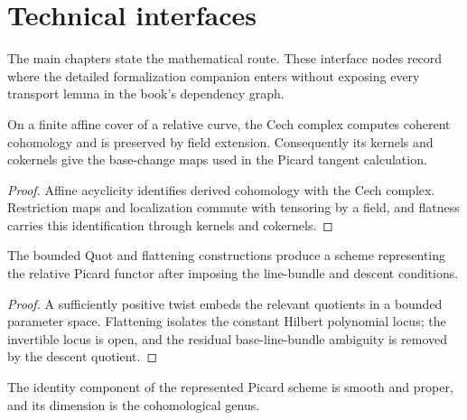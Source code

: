 \chapter{Technical interfaces}
\label{mk-app-technical}

The main chapters state the mathematical route.  These interface nodes record
where the detailed formalization companion enters without exposing every
transport lemma in the book's dependency graph.

\begin{proposition}
  \label{mk-app-cech-interface}
  \cite{stacks-cohomology-schemes,stacks-project}
  On a finite affine cover of a relative curve, the Cech complex computes
  coherent cohomology and is preserved by field extension.  Consequently its
  kernels and cokernels give the base-change maps used in the Picard tangent
  calculation.
\end{proposition}

\begin{proof}
  Affine acyclicity identifies derived cohomology with the Cech complex.
  Restriction maps and localization commute with tensoring by a field, and
  flatness carries this identification through kernels and cokernels.
\end{proof}

\begin{proposition}
  \label{mk-app-picard-parameter-interface}
  \cite{kleiman-picard,nitsure-hilbert-quot}
  The bounded Quot and flattening constructions produce a scheme representing
  the relative Picard functor after imposing the line-bundle and descent
  conditions.
\end{proposition}

\begin{proof}
  A sufficiently positive twist embeds the relevant quotients in a bounded
  parameter space.  Flattening isolates the constant Hilbert polynomial locus;
  the invertible locus is open, and the residual base-line-bundle ambiguity is
  removed by the descent quotient.
\end{proof}

\begin{proposition}
  \label{mk-app-identity-interface}
  \cite{kleiman-picard}
  The identity component of the represented Picard scheme is smooth and
  proper, and its dimension is the cohomological genus.
\end{proposition}


